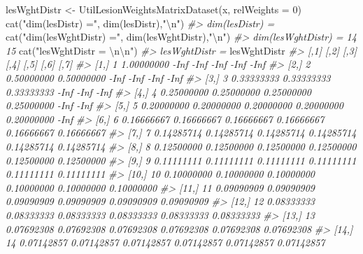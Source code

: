 \documentclass[
]{book}
\newenvironment{Shaded}{\begin{snugshade}}{\end{snugshade}}
\newcommand{\AttributeTok}[1]{\textcolor[rgb]{0.77,0.63,0.00}{#1}}
\newcommand{\CommentTok}[1]{\textcolor[rgb]{0.56,0.35,0.01}{\textit{#1}}}
\newcommand{\DecValTok}[1]{\textcolor[rgb]{0.00,0.00,0.81}{#1}}
\newcommand{\FunctionTok}[1]{\textcolor[rgb]{0.00,0.00,0.00}{#1}}
\newcommand{\NormalTok}[1]{#1}
\newcommand{\OtherTok}[1]{\textcolor[rgb]{0.56,0.35,0.01}{#1}}
\newcommand{\SpecialCharTok}[1]{\textcolor[rgb]{0.00,0.00,0.00}{#1}}
\newcommand{\StringTok}[1]{\textcolor[rgb]{0.31,0.60,0.02}{#1}}
\begin{document}
\begin{Shaded}
\begin{Highlighting}[]
\NormalTok{lesWghtDistr }\OtherTok{\textless{}{-}} \FunctionTok{UtilLesionWeightsMatrixDataset}\NormalTok{(x, }\AttributeTok{relWeights =} \DecValTok{0}\NormalTok{)}
\FunctionTok{cat}\NormalTok{(}\StringTok{"dim(lesDistr) ="}\NormalTok{, }\FunctionTok{dim}\NormalTok{(lesDistr),}\StringTok{"}\SpecialCharTok{\textbackslash{}n}\StringTok{"}\NormalTok{)}
\CommentTok{\#\textgreater{} dim(lesDistr) =}
\FunctionTok{cat}\NormalTok{(}\StringTok{"dim(lesWghtDistr) ="}\NormalTok{, }\FunctionTok{dim}\NormalTok{(lesWghtDistr),}\StringTok{"}\SpecialCharTok{\textbackslash{}n}\StringTok{"}\NormalTok{)}
\CommentTok{\#\textgreater{} dim(lesWghtDistr) = 14 15}
\FunctionTok{cat}\NormalTok{(}\StringTok{"lesWghtDistr = }\SpecialCharTok{\textbackslash{}n\textbackslash{}n}\StringTok{"}\NormalTok{)}
\CommentTok{\#\textgreater{} lesWghtDistr =}
\NormalTok{lesWghtDistr}
\CommentTok{\#\textgreater{}       [,1]       [,2]       [,3]       [,4]       [,5]       [,6]       [,7]}
\CommentTok{\#\textgreater{}  [1,]    1 1.00000000       {-}Inf       {-}Inf       {-}Inf       {-}Inf       {-}Inf}
\CommentTok{\#\textgreater{}  [2,]    2 0.50000000 0.50000000       {-}Inf       {-}Inf       {-}Inf       {-}Inf}
\CommentTok{\#\textgreater{}  [3,]    3 0.33333333 0.33333333 0.33333333       {-}Inf       {-}Inf       {-}Inf}
\CommentTok{\#\textgreater{}  [4,]    4 0.25000000 0.25000000 0.25000000 0.25000000       {-}Inf       {-}Inf}
\CommentTok{\#\textgreater{}  [5,]    5 0.20000000 0.20000000 0.20000000 0.20000000 0.20000000       {-}Inf}
\CommentTok{\#\textgreater{}  [6,]    6 0.16666667 0.16666667 0.16666667 0.16666667 0.16666667 0.16666667}
\CommentTok{\#\textgreater{}  [7,]    7 0.14285714 0.14285714 0.14285714 0.14285714 0.14285714 0.14285714}
\CommentTok{\#\textgreater{}  [8,]    8 0.12500000 0.12500000 0.12500000 0.12500000 0.12500000 0.12500000}
\CommentTok{\#\textgreater{}  [9,]    9 0.11111111 0.11111111 0.11111111 0.11111111 0.11111111 0.11111111}
\CommentTok{\#\textgreater{} [10,]   10 0.10000000 0.10000000 0.10000000 0.10000000 0.10000000 0.10000000}
\CommentTok{\#\textgreater{} [11,]   11 0.09090909 0.09090909 0.09090909 0.09090909 0.09090909 0.09090909}
\CommentTok{\#\textgreater{} [12,]   12 0.08333333 0.08333333 0.08333333 0.08333333 0.08333333 0.08333333}
\CommentTok{\#\textgreater{} [13,]   13 0.07692308 0.07692308 0.07692308 0.07692308 0.07692308 0.07692308}
\CommentTok{\#\textgreater{} [14,]   14 0.07142857 0.07142857 0.07142857 0.07142857 0.07142857 0.07142857}

\end{Highlighting}
\end{Shaded}
\end{document}
